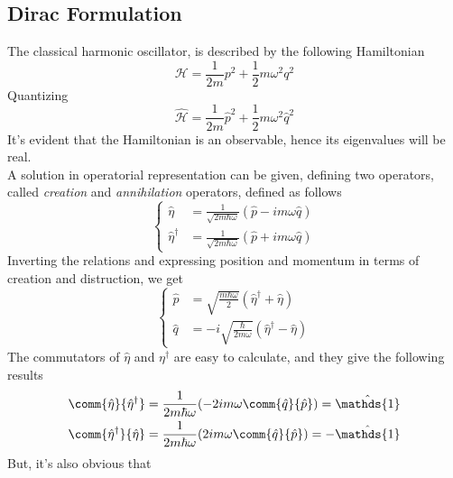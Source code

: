 \documentclass[a4paper, 11pt]{book}
\newcommand{\1}{\opr{\mathds{1}}}
\newcommand{\ham}{\mathcal{H}}
\newcommand{\opr}[1]{\hat{#1}}
\newcommand{\adj}[2][]{#2^{\dagger#1}}
\theoremstyle{plain}
\begin{document}
	\subsection{Dirac Formulation}
	The classical harmonic oscillator, is described by the following Hamiltonian
	\begin{equation}
		\ham=\frac{1}{2m}p^2+\frac{1}{2}m\omega^2q^2
		\label{eq:classharmham}
	\end{equation}
	Quantizing
	\begin{equation}
		\opr{\ham}=\frac{1}{2m}\opr{p}^2+\frac{1}{2}m\omega^2\opr{q}^2
		\label{eq:qhoham}
	\end{equation}
	It's evident that the Hamiltonian is an observable, hence its eigenvalues will be real.\\
	A solution in operatorial representation can be given, defining two operators, called \textit{creation} and \textit{annihilation} operators, defined as follows
	\begin{equation}
		\left\{ \begin{aligned}
				\opr{\eta}&=\frac{1}{\sqrt{2m\hbar\omega}}(\opr{p}-im\omega\opr{q})\\
				\adj{\opr{\eta}}&=\frac{1}{\sqrt{2m\hbar\omega}}(\opr{p}+im\omega\opr{q})
		\end{aligned}\right.
		\label{eq:creationdestruction}
	\end{equation}
	Inverting the relations and expressing position and momentum in terms of creation and distruction, we get
	\begin{equation}
		\left\{ \begin{aligned}
				\opr{p}&=\sqrt{\frac{m\hbar\omega}{2}}(\adj{\opr{\eta}}+\opr{\eta})\\
				\opr{q}&=-i\sqrt{\frac{\hbar}{2m\omega}}(\adj{\opr{\eta}}-\opr{\eta})
		\end{aligned}\right.
		\label{eq:pqcd}
	\end{equation}
	The commutators of $\opr{\eta}$ and $\adj{\eta}$ are easy to calculate, and they give the following results
	\begin{equation}
		\begin{aligned}
			\comm{\opr{\eta}}{\adj{\opr{\eta}}}&=\frac{1}{2m\hbar\omega}(-2im\omega\comm{\opr{q}}{\opr{p}})=\1\\
			\comm{\adj{\opr{\eta}}}{\opr{\eta}}&=\frac{1}{2m\hbar\omega}(2im\omega\comm{\opr{q}}{\opr{p}})=-\1
		\end{aligned}
		\label{eq:comm}
	\end{equation}
	But, it's also obvious that
\end{document}
